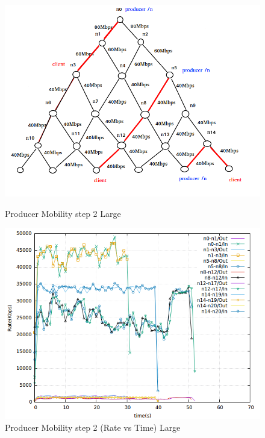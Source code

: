 \begin{figure}[H]

\begin{center}


\includegraphics[scale = 0.4]{Figures/Step2.png}

\caption{Producer Mobility step 2 Large} \label{Step2} 

\includegraphics[scale = 0.4]{Figures/step2.png}

\caption{Producer Mobility step 2 (Rate vs Time) Large} \label{step2} 


\end{center}

\end{figure}




